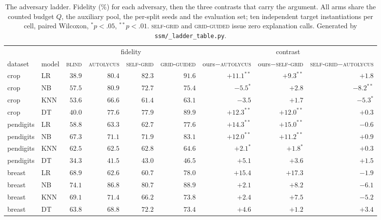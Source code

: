 \documentclass[sigconf,anonymous,review]{acmart}
\begin{document}
\begin{table}[t]
\centering
\caption{The adversary ladder. Fidelity (\%) for each adversary, then the three contrasts that carry
the argument. All arms share the counted budget $Q$, the auxiliary pool, the per-split seeds and the
evaluation set; ten independent target instantiations per cell, paired Wilcoxon, $^{*}p{<}.05$,
$^{**}p{<}.01$. \textsc{self-grid} and \textsc{grid-guided} issue zero explanation calls.
Generated by \texttt{ssm/\_ladder\_table.py}.}
\label{tab:ladder}
\begin{tabular}{llrrrrrrr}
\toprule
& & \multicolumn{4}{c}{fidelity} & \multicolumn{3}{c}{contrast} \\
\cmidrule(lr){3-6}\cmidrule(lr){7-9}
dataset & model & \textsc{blind} & \textsc{autolycus} & \textsc{self-grid} & \textsc{grid-guided}
& ours$-$\textsc{autolycus} & ours$-$\textsc{self-grid} & \textsc{self-grid}$-$\textsc{autolycus} \\
\midrule
crop       & LR   & $38.9$ & $80.4$ & $82.3$ & $91.6$ & $+11.1^{**}$ & $+9.3^{**}$ & $+1.8$ \\
crop       & NB   & $57.5$ & $80.9$ & $72.7$ & $75.4$ & $-5.5^{*}$ & $+2.8$ & $-8.2^{**}$ \\
crop       & KNN  & $53.6$ & $66.6$ & $61.4$ & $63.1$ & $-3.5$ & $+1.7$ & $-5.3^{*}$ \\
crop       & DT   & $40.0$ & $77.6$ & $77.9$ & $89.9$ & $+12.3^{**}$ & $+12.0^{**}$ & $+0.3$ \\
\addlinespace
pendigits  & LR   & $58.8$ & $63.3$ & $62.7$ & $77.6$ & $+14.3^{**}$ & $+15.0^{**}$ & $-0.6$ \\
pendigits  & NB   & $67.3$ & $71.1$ & $71.9$ & $83.1$ & $+12.0^{**}$ & $+11.2^{**}$ & $+0.9$ \\
pendigits  & KNN  & $62.5$ & $62.5$ & $62.8$ & $64.6$ & $+2.1^{*}$ & $+1.8^{*}$ & $+0.3$ \\
pendigits  & DT   & $34.3$ & $41.5$ & $43.0$ & $46.5$ & $+5.1$ & $+3.6$ & $+1.5$ \\
\addlinespace
breast     & LR   & $68.9$ & $62.6$ & $60.7$ & $78.0$ & $+15.4$ & $+17.3$ & $-1.9$ \\
breast     & NB   & $74.1$ & $86.8$ & $80.7$ & $88.9$ & $+2.1$ & $+8.2$ & $-6.1$ \\
breast     & KNN  & $69.1$ & $71.4$ & $66.2$ & $73.8$ & $+2.4$ & $+7.5$ & $-5.2$ \\
breast     & DT   & $63.8$ & $68.8$ & $72.2$ & $73.4$ & $+4.6$ & $+1.2$ & $+3.4$ \\

\end{tabular}
\end{table}
\end{document}

